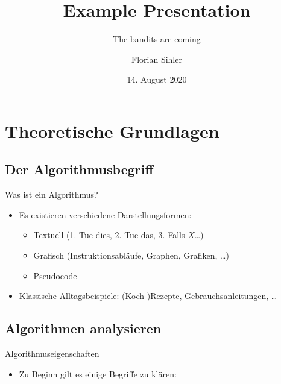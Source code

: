 \documentclass[aspectratio=169,usepdftitle=true]{beamer}
\title{Example Presentation}
\subtitle{The bandits are coming}
\date[14.08.2020]{14. August 2020}
\author[F.~Sihler]{Florian Sihler}
\begin{document}
\titleframe
\section{Theoretische Grundlagen}
\subsection{Der Algorithmusbegriff}
\begin{frame}{Was ist ein Algorithmus?}
    \begin{itemize}
        \item Es existieren verschiedene Darstellungsformen: \begin{itemize}
            \item Textuell (1. Tue dies, 2. Tue das, 3. Falls \(X\)\ldots)
            \item Grafisch (Instruktionsabläufe, Graphen, Grafiken, \ldots)
            \item Pseudocode
        \end{itemize}
        \item Klassische Alltagsbeispiele: (Koch-)Rezepte, Gebrauchsanleitungen, \ldots
    \end{itemize}
\end{frame}

\subsection{Algorithmen analysieren}
\begin{frame}{Algorithmuseigenschaften}
    \begin{itemize}[<+(1)->]
        \item Zu Beginn gilt es einige Begriffe zu klären: 
    \end{itemize}
\end{frame}
\end{document}
